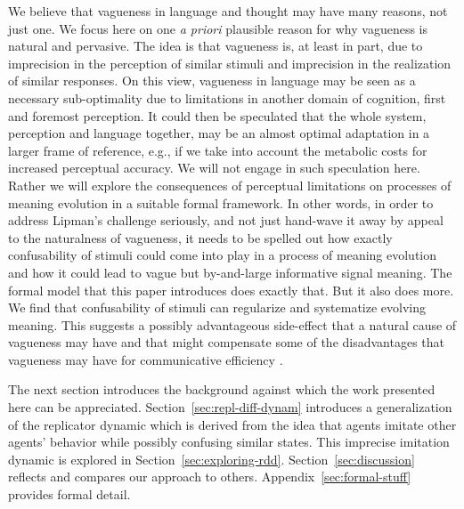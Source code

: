 \documentclass[fleqn,reqno,10pt]{article}
\begin{document}
We believe that vagueness in language and thought may have many reasons, not just one. We focus
here on one \emph{a priori} plausible reason for why vagueness is natural and pervasive. The
idea is that vagueness is, at least in part, due to imprecision in the perception of similar
stimuli and imprecision in the realization of similar responses. On this view, vagueness in
language may be seen as a necessary sub-optimality due to limitations in another domain of
cognition, first and foremost perception. It could then be speculated that the whole system,
perception and language together, may be an almost optimal adaptation in a larger frame
of reference, e.g., if we take into account the metabolic costs for increased perceptual
accuracy. We will not engage in such speculation here. Rather we will explore the consequences
of perceptual limitations on processes of meaning evolution in a suitable formal framework. In
other words, in order to address Lipman's challenge seriously, and not just hand-wave it away
by appeal to the naturalness of vagueness, it needs to be spelled out how exactly confusability
of stimuli could come into play in a process of meaning evolution and how it could lead to
vague but by-and-large informative signal meaning. The formal model that this paper introduces
does exactly that. But it also does more. We find that confusability of stimuli can regularize
and systematize evolving meaning. This suggests a possibly advantageous side-effect that a
natural cause of vagueness may have and that might compensate some of the disadvantages that
vagueness may have for communicative efficiency \citep[c.f.][]{OConnor2013:The-Evolution-o}.


The next section introduces the background against which the work presented here can be
appreciated. Section~\ref{sec:repl-diff-dynam} introduces a generalization of the replicator
dynamic which is derived from the idea that agents imitate other agents' behavior while
possibly confusing similar states. This imprecise imitation dynamic is explored in
Section~\ref{sec:exploring-rdd}. Section~\ref{sec:discussion} reflects and compares our
approach to others. Appendix~\ref{sec:formal-stuff} provides formal detail.
\end{document}
